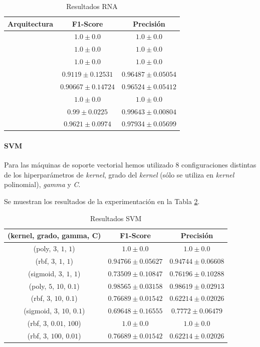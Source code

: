 \documentclass[12pt]{article}
\begin{document}
\begin{table}[ht]
	\caption{Resultados RNA}
	\centering
		 \begin{tabular}{||c c c||}
			 \hline
			 Arquitectura & F1-Score & Precisión  \\ [0.5ex]
			 \hline\hline
			 [2] & $1.0 \pm 0.0$ & $1.0 \pm 0.0$ \\
			 \hline
			 [4] & $1.0 \pm 0.0$ & $1.0 \pm 0.0$ \\
			 \hline
			 [8] & $1.0 \pm 0.0$ & $1.0 \pm 0.0$ \\
			 \hline
			 [2, 4] & $0.9119 \pm 0.12531$ & $0.96487 \pm 0.05054$ \\
			 \hline
			 [2, 8] & $0.90667 \pm 0.14724$ & $0.96524 \pm 0.05412$ \\
			 \hline
			 [4, 2] & $1.0 \pm 0.0$ & $1.0 \pm 0.0$ \\
			 \hline
			 [4, 4] & $0.99 \pm 0.0225$ & $0.99643 \pm 0.00804$ \\
			 \hline
			 [4, 8] & $0.9621 \pm 0.0974$ & $0.97934 \pm 0.05699$ \\
			 \hline
		 \end{tabular}
	\label{Tab:ANN_1}
\end{table}

\paragraph{SVM}

Para las máquinas de soporte vectorial hemos utilizado 8 configuraciones distintas de los hiperparámetros de \textit{kernel},
grado del \textit{kernel} (sólo se utiliza en \textit{kernel} polinomial), \textit{gamma} y \textit{C}.

Se muestran los resultados de la experimentación en la Tabla \ref{Tab:SVM_1}.

\begin{table}[!ht]
	\caption{Resultados SVM}
	\centering
		\begin{tabular}{||c c c||}
		 \hline
		 (kernel, grado, gamma, C) & F1-Score & Precisión  \\ [0.5ex]
		 \hline\hline
		 (poly, $3$, $1$, $1$) & $1.0 \pm 0.0$ & $1.0 \pm 0.0$ \\
		 \hline
		 (rbf, $3$, $1$, $1$) & $0.94766 \pm 0.05627$ & $0.94744 \pm 0.06608$ \\
		 \hline
		 (sigmoid, $3$, $1$, $1$) & $0.73509 \pm 0.10847$ & $0.76196 \pm 0.10288$ \\
		 \hline
		 (poly, $5$, $10$, $0.1$) & $0.98565 \pm 0.03158$ & $0.98619 \pm 0.02913$ \\
		 \hline
		 (rbf, $3$, $10$, $0.1$) & $0.76689 \pm 0.01542$ & $0.62214 \pm 0.02026$ \\
		 \hline
		 (sigmoid, $3$, $10$, $0.1$) & $0.69648 \pm 0.16555$ & $0.7772 \pm 0.06479$ \\
		 \hline
		 (rbf, $3$, $0.01$, $100$) & $1.0 \pm 0.0$ & $1.0 \pm 0.0$ \\
		 \hline
		 (rbf, $3$, $100$, $0.01$) & $0.76689 \pm 0.01542$ & $0.62214 \pm 0.02026$ \\
		 \hline
	 \end{tabular}
	\label{Tab:SVM_1}
\end{table}
\end{document}
